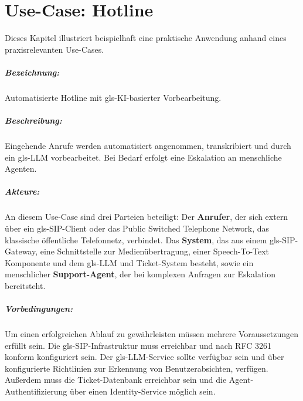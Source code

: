 
\chapter{Use-Case: Hotline}
\thispagestyle{scrheadings}
\label{ch:anhang-usecase}

Dieses Kapitel illustriert beispielhaft eine praktische Anwendung anhand eines praxisrelevanten Use-Cases.

\paragraph{Bezeichnung:}
Automatisierte Hotline mit \gls{gls-KI}-basierter Vorbearbeitung.

\paragraph{Beschreibung:}
Eingehende Anrufe werden automatisiert angenommen, transkribiert und durch ein \gls{gls-LLM} vorbearbeitet. Bei Bedarf erfolgt eine Eskalation an menschliche Agenten.

\paragraph{Akteure:}
An diesem Use-Case sind drei Parteien beteiligt: Der \textbf{Anrufer}, der sich extern über ein \gls{gls-SIP}-Client oder das Public Switched Telephone Network, das klassische öffentliche Telefonnetz, verbindet. Das \textbf{System}, das aus einem \gls{gls-SIP}-Gateway, eine Schnittstelle zur Medienübertragung, einer Speech-To-Text Komponente und dem \gls{gls-LLM} und Ticket-System besteht, sowie ein menschlicher \textbf{Support-Agent}, der bei komplexen Anfragen zur Eskalation bereitsteht.

\paragraph{Vorbedingungen:}
Um einen erfolgreichen Ablauf zu gewährleisten müssen mehrere Voraussetzungen erfüllt sein. Die \gls{gls-SIP}-Infrastruktur muss erreichbar und nach RFC 3261 konform konfiguriert sein. Der \gls{gls-LLM}-Service sollte verfügbar sein und
über konfigurierte Richtlinien zur Erkennung von Benutzerabsichten, verfügen. Au\ss erdem muss die Ticket-Datenbank erreichbar sein und die Agent-Authentifizierung über einen Identity-Service möglich sein.

